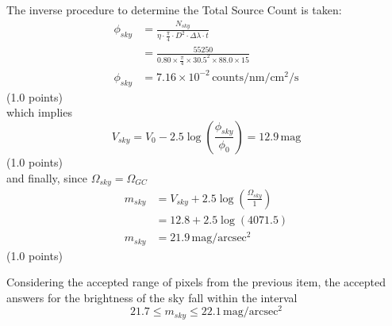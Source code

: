 \begin{description}
The inverse procedure to determine the Total Source Count is taken:
\begin{align*}
\phi_{sky} &= \frac{N_{sky}}
  {\eta \cdot \frac{\pi}{4} \cdot D^2 \cdot \Delta\lambda \cdot t} \\
  &= \frac{55250}
  {0.80 \times \frac{\pi}{4} \times 30.5^2 \times 88.0 \times 15} \\
\phi_{sky} &= 7.16 \times 10^{-2}\,\mathrm{counts/nm/cm^2/s}
\end{align*}
\hfill(1.0 points)\\
which implies
\[ V_{sky} = V_0 - 2.5\log\left(\frac{\phi_{sky}}{\phi_0}\right)
   = 12.9\,\mathrm{mag} \]
\hfill(1.0 points)\\
and finally, since $\Omega_{sky} = \Omega_{GC}$
\begin{align*}
m_{sky} &= V_{sky} + 2.5\log\left(\frac{\Omega_{sky}}{1}\right) \\
  &= 12.8 + 2.5\log(4071.5) \\
m_{sky} &= 21.9\,\mathrm{mag/arcsec^2}
\end{align*}
\hfill(1.0 points)

Considering the accepted range of pixels from the previous item, the
accepted answers for the brightness of the sky fall within the interval
\[ 21.7 \leqslant m_{sky} \leqslant 22.1\,\mathrm{mag/arcsec^2} \]
\end{description}

